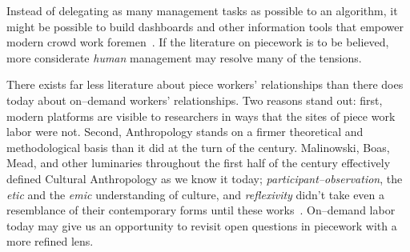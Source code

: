 \documentclass[trackingWork]{subfiles}
\begin{document}
Instead of delegating as many management tasks as possible to an algorithm,
it might be possible to build dashboards and
other information tools that empower modern crowd work foremen~\cite{kulkarni2012mobileworks}.
If the literature on piecework is to be believed,
more considerate \textit{human} management may resolve
many of the tensions.

There exists far less literature about piece workers' relationships than there does today about on--demand workers' relationships.
Two reasons stand out: first, modern platforms are visible to researchers in ways that the sites of piece work labor were not.
Second, Anthropology stands on a firmer theoretical and methodological basis than it did at the turn of the  century.
Malinowski, Boas, Mead, and
other luminaries throughout the first half of the  century
effectively defined Cultural Anthropology as we know it today;
\textit{participant--observation},
the \textit{etic} and the \textit{emic} understanding of culture, and
\textit{reflexivity}
didn't take even a resemblance of their contemporary forms until these works~\cite{malinowski2002argonauts,boas1940race,mead1973coming}.
On--demand labor today may give us an opportunity to revisit open questions in piecework with a more refined lens.





\end{document}
